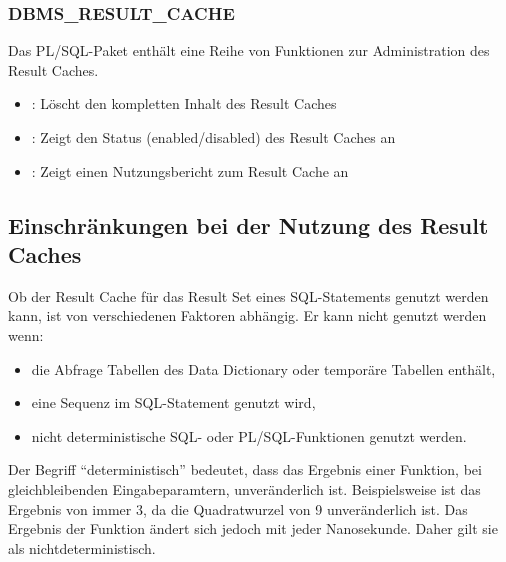         \subsubsection{DBMS\_RESULT\_CACHE}
          Das PL/SQL-Paket  enth\"alt eine Reihe von Funktionen zur Administration des Result Caches.
          \begin{itemize}
            \item {}: L\"oscht den kompletten Inhalt des Result Caches
            \item {}: Zeigt den Status (enabled/disabled) des Result Caches an
            \item {}: Zeigt einen Nutzungsbericht zum Result Cache an
          \end{itemize}
      \subsection{Einschr\"ankungen bei der Nutzung des Result Caches}
        Ob der Result Cache f\"ur das Result Set eines SQL-Statements genutzt werden kann, ist von verschiedenen Faktoren abh\"angig. Er kann nicht genutzt werden wenn:
        \begin{itemize}
          \item die Abfrage Tabellen des Data Dictionary oder tempor\"are Tabellen enth\"alt,
          \item eine Sequenz im SQL-Statement genutzt wird,
          \item nicht deterministische SQL- oder PL/SQL-Funktionen genutzt werden.
        \end{itemize}
        \begin{merke}
          Der Begriff \enquote{deterministisch} bedeutet, dass das Ergebnis
          einer Funktion, bei gleichbleibenden Eingabeparamtern,
          unver\"anderlich ist. Beispielsweise ist das Ergebnis von
           immer 3, da die Quadratwurzel von 9
          unver\"anderlich ist. Das Ergebnis der Funktion
           \"andert sich jedoch mit jeder Nanosekunde. Daher gilt sie als nichtdeterministisch.
        \end{merke}

